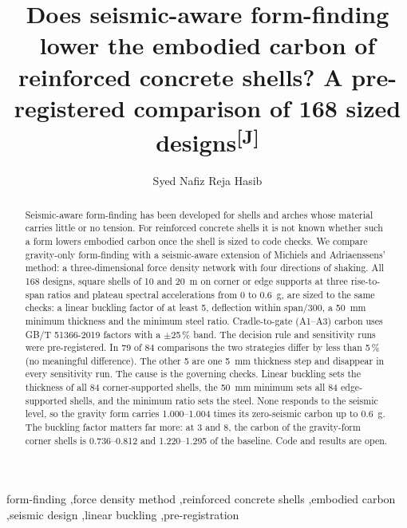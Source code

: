 \documentclass[preprint,12pt]{elsarticle}
\newcommand{\jud}{\textsuperscript{\textcolor{markcol}{\sffamily\scriptsize[J]}}}
\newcommand{\unk}{\textcolor{markcol}{\sffamily\small[?]}}
\newcommand{\jud}{}
\newcommand{\unk}{}
\begin{document}
\begin{frontmatter}

\title{Does seismic-aware form-finding lower the embodied carbon of reinforced concrete shells? A pre-registered comparison of 168 sized designs\jud}

\author{Syed Nafiz Reja Hasib}
\address{Affiliation \unk}

\begin{abstract}
Seismic-aware form-finding has been developed for shells and arches whose material carries little or no tension. For reinforced concrete shells it is not known whether such a form lowers embodied carbon once the shell is sized to code checks. We compare gravity-only form-finding with a seismic-aware extension of Michiels and Adriaenssens' method: a three-dimensional force density network with four directions of shaking. All 168 designs, square shells of 10 and 20~m on corner or edge supports at three rise-to-span ratios and plateau spectral accelerations from 0 to 0.6~g, are sized to the same checks: a linear buckling factor of at least 5, deflection within span/300, a 50~mm minimum thickness and the minimum steel ratio. Cradle-to-gate (A1--A3) carbon uses GB/T 51366-2019 factors with a $\pm$25\,\% band. The decision rule and sensitivity runs were pre-registered. In 79 of 84 comparisons the two strategies differ by less than 5\,\% (no meaningful difference). The other 5 are one 5~mm thickness step and disappear in every sensitivity run. The cause is the governing checks. Linear buckling sets the thickness of all 84 corner-supported shells, the 50~mm minimum sets all 84 edge-supported shells, and the minimum ratio sets the steel. None responds to the seismic level, so the gravity form carries 1.000--1.004 times its zero-seismic carbon up to 0.6~g. The buckling factor matters far more: at 3 and 8, the carbon of the gravity-form corner shells is 0.736--0.812 and 1.220--1.295 of the baseline. Code and results are open.
\end{abstract}

\begin{keyword}
form-finding \sep force density method \sep reinforced concrete shells \sep embodied carbon \sep seismic design \sep linear buckling \sep pre-registration
\end{keyword}

\end{frontmatter}

\linenumbers
\setlength{\emergencystretch}{1.5em}
\end{document}
